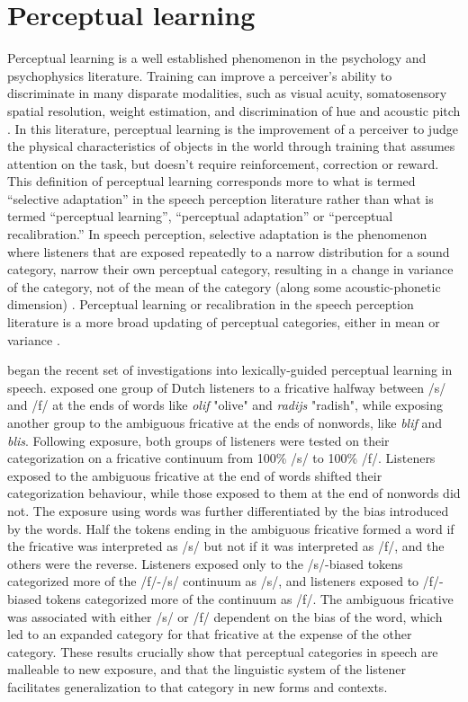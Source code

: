 \section{Perceptual learning}
\label{sec:perceptuallearning}

Perceptual learning is a well established phenomenon in the psychology and psychophysics literature. 
Training can improve a perceiver's ability to discriminate in many disparate modalities, such as visual acuity, somatosensory spatial resolution, weight estimation, and discrimination of hue and acoustic pitch \citep[for review]{Gibson1953}. 
In this literature, perceptual learning is the improvement of a perceiver to judge the physical characteristics of objects in the world through training that assumes attention on the task, but doesn't require reinforcement, correction or reward.
This definition of perceptual learning corresponds more to what is termed ``selective adaptation'' in the speech perception literature rather than what is termed ``perceptual learning'', ``perceptual adaptation'' or ``perceptual recalibration.''  
In speech perception, selective adaptation is the phenomenon where listeners that are exposed repeatedly to a narrow distribution for a sound category, narrow their own perceptual category, resulting in a change in variance of the category, not of the mean of the category (along some acoustic-phonetic dimension) \citep{Eimas1973,Samuel1986,Vroomen2007}.
Perceptual learning or recalibration in the speech perception literature is a more broad updating of perceptual categories, either in mean or variance \citep{Norris2003, Vroomen2007}.

\citet{Norris2003} began the recent set of investigations into lexically-guided perceptual learning in speech.
\citet{Norris2003} exposed one group of Dutch listeners to a fricative halfway between /s/ and /f/ at the ends of words like \emph{olif} "olive" and \emph{radijs} "radish", while exposing another group to the ambiguous fricative at the ends of nonwords, like \emph{blif} and \emph{blis}.
Following exposure, both groups of listeners were tested on their categorization on a fricative continuum from 100\% /s/ to 100\% /f/. 
Listeners exposed to the ambiguous fricative at the end of words shifted their categorization behaviour, while those exposed to them at the end of nonwords did not.  The exposure using words was further differentiated by the bias introduced by the words.  
Half the tokens ending in the ambiguous fricative formed a word if the fricative was interpreted as /s/ but not if it was interpreted as /f/, and the others were the reverse.  
Listeners exposed only to the /s/-biased tokens categorized more of the /f/-/s/ continuum as /s/, and listeners exposed to /f/-biased tokens categorized more of the continuum as /f/.  
The ambiguous fricative was associated with either /s/ or /f/ dependent on the bias of the word, which led to an expanded category for that fricative at the expense of the other category.
These results crucially show that perceptual categories in speech are malleable to new exposure, and that the linguistic system of the listener facilitates generalization to that category in new forms and contexts.

